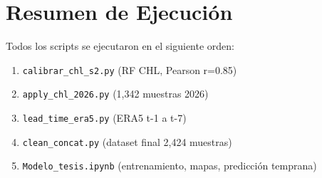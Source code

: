 \documentclass[12pt]{article}
\begin{document}
\section*{Resumen de Ejecuci\'on}

Todos los scripts se ejecutaron en el siguiente orden:
\begin{enumerate}
  \item \texttt{calibrar\_chl\_s2.py} (RF CHL, Pearson r=0.85)
  \item \texttt{apply\_chl\_2026.py} (1,342 muestras 2026)
  \item \texttt{lead\_time\_era5.py} (ERA5 t-1 a t-7)
  \item \texttt{clean\_concat.py} (dataset final 2,424 muestras)
  \item \texttt{Modelo\_tesis.ipynb} (entrenamiento, mapas, predicci\'on temprana)
\end{enumerate}
\end{document}
